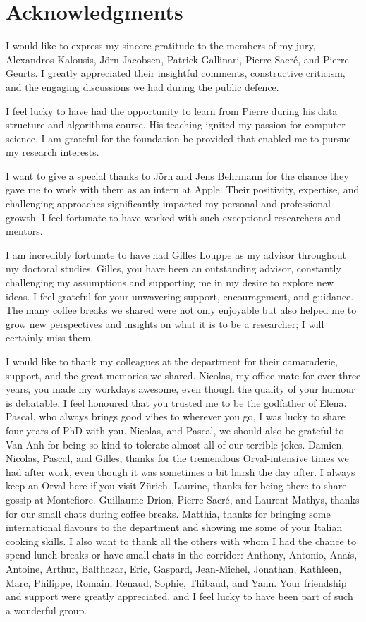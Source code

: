
\chapter*{Acknowledgments}
I would like to express my sincere gratitude to the members of my jury, Alexandros Kalousis, J{\"o}rn Jacobsen, Patrick Gallinari, Pierre Sacr{\'e}, and Pierre Geurts. I greatly appreciated their insightful comments, constructive criticism, and the engaging discussions we had during the public defence.

I feel lucky to have had the opportunity to learn from Pierre during his data structure and algorithms course. His teaching ignited my passion for computer science. I am grateful for the foundation he provided that enabled me to pursue my research interests.

I want to give a special thanks to J{\"o}rn and Jens Behrmann for the chance they gave me to work with them as an intern at Apple. Their positivity, expertise, and challenging approaches significantly impacted my personal and professional growth. I feel fortunate to have worked with such exceptional researchers and mentors.

I am incredibly fortunate to have had Gilles Louppe as my advisor throughout my doctoral studies. Gilles, you have been an outstanding advisor, constantly challenging my assumptions and supporting me in my desire to explore new ideas. I feel grateful for your unwavering support, encouragement, and guidance. The many coffee breaks we shared were not only enjoyable but also helped me to grow new perspectives and insights on what it is to be a researcher; I will certainly miss them.

I would like to thank my colleagues at the department for their camaraderie, support, and the great memories we shared. Nicolas, my office mate for over three years, you made my workdays awesome, even though the quality of your humour is debatable. I feel honoured that you trusted me to be the godfather of Elena. Pascal, who always brings good vibes to wherever you go, I was lucky to share four years of PhD with you. Nicolas, and Pascal, we should also be grateful to Van Anh for being so kind to tolerate almost all of our terrible jokes. Damien, Nicolas, Pascal, and Gilles, thanks for the tremendous Orval-intensive times we had after work, even though it was sometimes a bit harsh the day after. I always keep an Orval here if you visit Z{\"u}rich. Laurine, thanks for being there to share gossip at Montefiore. Guillaume Drion, Pierre Sacr{\'e}, and Laurent Mathys, thanks for our small chats during coffee breaks. Matthia, thanks for bringing some international flavours to the department and showing me some of your Italian cooking skills. I also want to thank all the others with whom I had the chance to spend lunch breaks or have small chats in the corridor: Anthony, Antonio, Ana{\"i}s, Antoine, Arthur, Balthazar, Eric, Gaspard, Jean-Michel, Jonathan, Kathleen, Marc, Philippe, Romain, Renaud, Sophie, Thibaud, and Yann. Your friendship and support were greatly appreciated, and I feel lucky to have been part of such a wonderful group.

